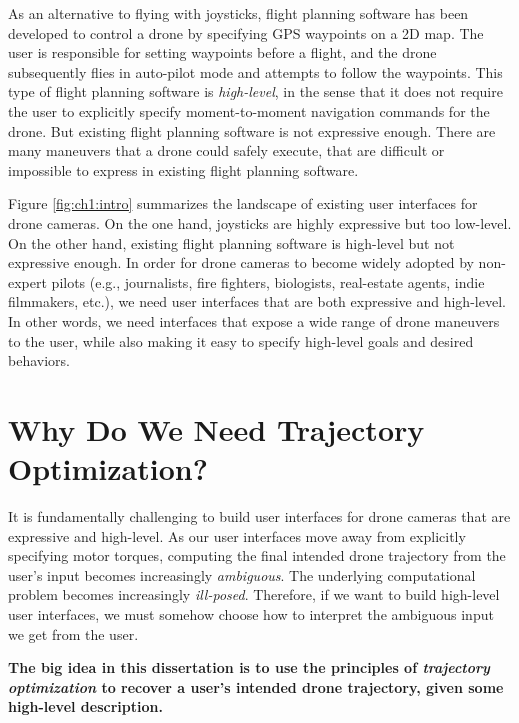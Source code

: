 As an alternative to flying with joysticks, flight planning software has been developed to control a drone by specifying GPS waypoints on a 2D map. 
The user is responsible for setting waypoints before a flight, and the drone subsequently flies in auto-pilot mode and attempts to follow the waypoints.
This type of flight planning software is \emph{high-level}, in the sense that it does not require the user to explicitly specify moment-to-moment navigation commands for the drone.
But existing flight planning software is not expressive enough.
There are many maneuvers that a drone could safely execute, that are difficult or impossible to express in existing flight planning software.

Figure \ref{fig:ch1:intro} summarizes the landscape of existing user interfaces for drone cameras.
On the one hand, joysticks are highly expressive but too low-level.
On the other hand, existing flight planning software is high-level but not expressive enough.
In order for drone cameras to become widely adopted by non-expert pilots (e.g., journalists, fire fighters, biologists, real-estate agents, indie filmmakers, etc.), we need user interfaces that are both expressive and high-level.
In other words, we need interfaces that expose a wide range of drone maneuvers to the user, while also making it easy to specify high-level goals and desired behaviors.

\section{Why Do We Need Trajectory Optimization?}

It is fundamentally challenging to build user interfaces for drone cameras that are expressive and high-level.
As our user interfaces move away from explicitly specifying motor torques, computing the final intended drone trajectory from the user's input becomes increasingly \emph{ambiguous}.
The underlying computational problem becomes increasingly \emph{ill-posed}.
Therefore, if we want to build high-level user interfaces, we must somehow choose how to interpret the ambiguous input we get from the user.

\begin{tcolorbox}[before skip=20pt, after skip=20pt, sharp corners]
\begin{center}
\textbf{The big idea in this dissertation is to use the principles of \emph{trajectory optimization} to recover a user's intended drone trajectory, given some high-level description.}
\end{center}
\end{tcolorbox}

